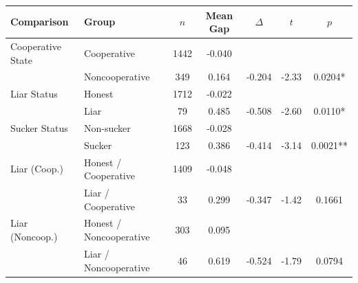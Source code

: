 \begin{tabular}{llccccc}
  \toprule
  Comparison & Group & $n$ & Mean Gap & $\Delta$ & $t$ & $p$ \\
  \midrule
  Cooperative State & Cooperative & 1442 & -0.040 & & & \\
   & Noncooperative & 349 & 0.164 & -0.204 & -2.33 & 0.0204* \\
  \addlinespace
  Liar Status & Honest & 1712 & -0.022 & & & \\
   & Liar & 79 & 0.485 & -0.508 & -2.60 & 0.0110* \\
  \addlinespace
  Sucker Status & Non-sucker & 1668 & -0.028 & & & \\
   & Sucker & 123 & 0.386 & -0.414 & -3.14 & 0.0021** \\
  \addlinespace
  Liar (Coop.) & Honest / Cooperative & 1409 & -0.048 & & & \\
   & Liar / Cooperative & 33 & 0.299 & -0.347 & -1.42 & 0.1661 \\
  \addlinespace
  Liar (Noncoop.) & Honest / Noncooperative & 303 & 0.095 & & & \\
   & Liar / Noncooperative & 46 & 0.619 & -0.524 & -1.79 & 0.0794 \\
  \bottomrule
\end{tabular}
